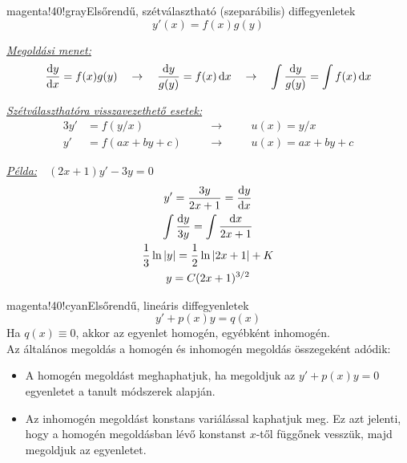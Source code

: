 \documentclass[main.tex]{subfiles}
\begin{document}
\begin{cbox}{magenta!40!gray}{Elsőrendű, szétválasztható (szeparábilis) diffegyenletek}
  \[
    y'(x) = f(x)g(y)
  \]

  \emph{\underline{Megoldási menet:}}
  \[
    \derivative{y}{x} = f(x)g(y)
    \quad \rightarrow \quad
    \frac{\differential y}{g(y)} = f(x) \, \differential x
    \quad \rightarrow \quad
    \int \frac{\differential y}{g(y)} = \int f(x) \, \differential x
  \]

  \emph{\underline{Szétválaszthatóra visszavezethető esetek:}}
  \begin{alignat*}{3}
    y'
          & = f(y/x)
    \quad &                  & \rightarrow \quad
          &                  & u(x) = y/x
    \\
    y'
          & = f(ax + by + c)
    \quad &                  & \rightarrow \quad
          &                  & u(x) = ax + by + c
  \end{alignat*}

  \emph{\underline{Példa:}}$\quad (2x+1)y'-3y=0$
  \begin{gather*}
    y' = \frac{3y}{2x + 1} = \derivative{y}{x}
    \\
    \int \frac{\differential y}{3y} = \int \frac{\differential x}{2x + 1}
    \\
    \frac{1}{3} \ln |y| = \frac{1}{2} \ln |2x + 1| + K
    \\
    y = C(2x + 1)^{3/2}
  \end{gather*}
\end{cbox}



\begin{cbox}{magenta!40!cyan}{Elsőrendű, lineáris diffegyenletek}
  \[
    y' + p(x) y = q(x)
  \]
  Ha $q(x) \equiv 0 $, akkor az egyenlet homogén, egyébként inhomogén.
  \\[2mm]
  Az általános megoldás a homogén és inhomogén megoldás
  összegeként adódik:
  \begin{itemize}
    \item A homogén megoldást meghaphatjuk, ha megoldjuk az
          $y' + p(x)y = 0$ egyenletet a tanult módszerek alapján.

    \item Az inhomogén megoldást konstans variálással
          kaphatjuk meg. Ez azt jelenti, hogy a homogén megoldásban
          lévő konstanst $x$-től függőnek vesszük, majd megoldjuk
          az egyenletet.
  \end{itemize}
\end{cbox}
\end{document}

